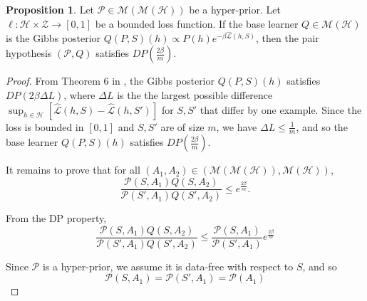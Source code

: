 \documentclass[letterpaper]{article} %
\theoremstyle{definition}
\newtheorem{proposition}[theorem]{Proposition}
\begin{document}
\begin{proposition} \label{thm:pair-is-dp-appendix}
	Let $\mathcal{P}\in \mathcal{M}(\mathcal{M}(\mathcal{H}))$ be a hyper-prior.
	Let $\ell:\mathcal{H}\times \mathcal{Z}\rightarrow [0,1]$ be a bounded loss function. If the base learner $Q\in \mathcal{M}(\mathcal{H})$ is the Gibbs posterior $Q(P, S)(h)\propto P(h)e^{-\beta\hat{\mathcal{L}}(h, S)}$, 
	then the pair hypothesis $(\mathcal{P}, Q)$ satisfies $DP\left (\frac{2\beta}{m}\right )$.
\end{proposition}

\begin{proof}
	From Theorem 6 in \citet{McSherry2007}, the Gibbs posterior $Q(P, S)(h)$ satisfies $DP\left (2\beta\Delta L\right )$, where $\Delta L$ is the the largest possible difference  $\sup_{h\in\mathcal{H}}[\hat{\mathcal{L}}(h,S)-\hat{\mathcal{L}}(h,S')]$ for $S,S'$ that differ by one example. Since the loss is bounded in $[0,1]$ and $S,S'$ are of size $m$, we have $\Delta L\leq \frac{1}{m}$, and so the base learner $Q(P, S)(h)$ satisfies $DP\left (\frac{2\beta}{m}\right )$.
	
	It remains to prove that for all $(A_1,A_2)\in (\mathcal{M}(\mathcal{M}(\mathcal{H})), \mathcal{M}(\mathcal{H}))$, 
	$$ \frac{\mathcal{P}(S, A_1)Q(S,A_2)}{\mathcal{P}(S', A_1)Q(S',A_2)}\leq e^{\frac{2\beta}{m}} .$$
	
	From the DP property, 
%	
	$$ \frac{\mathcal{P}(S, A_1)Q(S,A_2)}{\mathcal{P}(S', A_1)Q(S',A_2)}\leq \frac{\mathcal{P}(S, A_1)}{\mathcal{P}(S', A_1)}e^{\frac{2\beta}{m}}$$
	
	Since $\mathcal{P}$ is a hyper-prior, we assume it is data-free with respect to $S$, and so 
	$$\mathcal{P}(S, A_1)=\mathcal{P}(S', A_1)=\mathcal{P}(A_1)$$
	
\end{proof}
\end{document}
